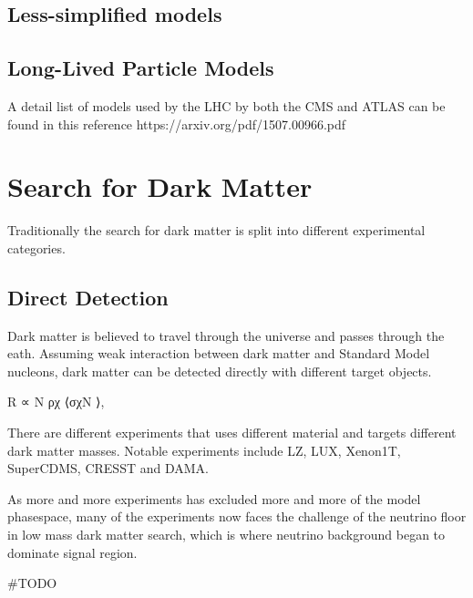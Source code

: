 \subsection{Less-simplified models}
\subsection{Long-Lived Particle Models}

A detail list of models used by the LHC by both the CMS and ATLAS can be found in this reference https://arxiv.org/pdf/1507.00966.pdf

\section{Search for Dark Matter}
Traditionally the search for dark matter is split into different experimental categories. 

\subsection{Direct Detection}
Dark matter is believed to travel through the universe and passes through the eath. Assuming weak interaction between dark matter and Standard Model nucleons, dark matter can be detected directly with different target objects. 

R ∝ N ρχ ⟨σχN ⟩,

There are different experiments that uses different material and targets different dark matter masses.
Notable experiments include LZ, LUX, Xenon1T, SuperCDMS, CRESST and DAMA. 

As more and more experiments has excluded more and more of the model phasespace, many of the experiments now faces the challenge of the neutrino floor in low mass dark matter search, which is where neutrino background began to dominate signal region. 


#TODO

